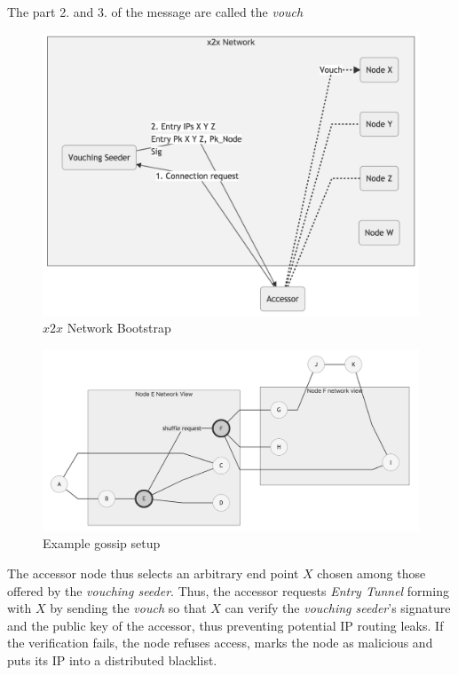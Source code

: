 The part 2. and 3. of the message are called the \emph{vouch}\\

\begin{figure}
\includegraphics[scale=0.18]{bootstrap}
\caption{$x2x$ Network Bootstrap}
\label{boot}
\end{figure}

\begin{figure}
\includegraphics[scale=0.25]{gossip1}
\caption{Example gossip setup}
\label{goss1}
\end{figure}


The accessor node thus selects an arbitrary end point \(X\) chosen among
those offered by the \emph{vouching seeder}. Thus, the accessor requests
\emph{Entry Tunnel} forming with \(X\) by sending the \emph{vouch} so
that \(X\) can verify the \emph{vouching seeder}'s signature and the
public key of the accessor, thus preventing potential IP routing leaks.
If the verification fails, the node refuses access, marks the node as
malicious and puts its IP into a distributed blacklist.

